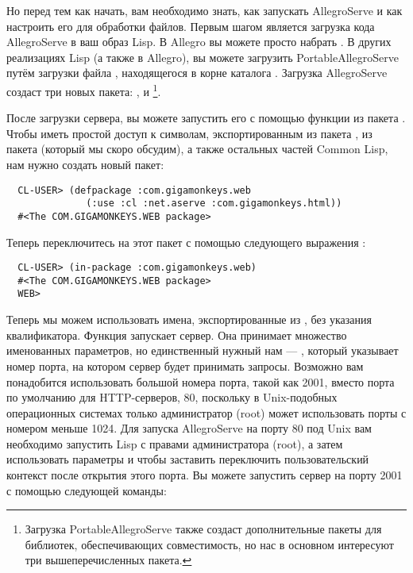 Но перед тем как начать, вам необходимо знать, как запускать AllegroServe и как настроить
его для обработки файлов. Первым шагом является загрузка кода AllegroServe в ваш образ
Lisp. В Allegro вы можете просто набрать . В других реализациях
Lisp (а также в Allegro), вы можете загрузить PortableAllegroServe путём загрузки файла
, находящегося в корне каталога . Загрузка
AllegroServe создаст три новых пакета: ,  и
\footnote{Загрузка PortableAllegroServe также создаст
  дополнительные пакеты для библиотек, обеспечивающих совместимость, но нас в основном
  интересуют три вышеперечисленных пакета.}.

После загрузки сервера, вы можете запустить его с помощью функции  из пакета
. Чтобы иметь простой доступ к символам, экспортированным из пакета
, из пакета  (который мы скоро обсудим), а
также остальных частей Common Lisp, нам нужно создать новый пакет:

\begin{lstlisting}
  CL-USER> (defpackage :com.gigamonkeys.web
              (:use :cl :net.aserve :com.gigamonkeys.html))
  #<The COM.GIGAMONKEYS.WEB package>
\end{lstlisting}

Теперь переключитесь на этот пакет с помощью следующего выражения :

\begin{lstlisting}
  CL-USER> (in-package :com.gigamonkeys.web)
  #<The COM.GIGAMONKEYS.WEB package>
  WEB>
\end{lstlisting} 

Теперь мы можем использовать имена, экспортированные из , без указания
квалификатора. Функция  запускает сервер. Она принимает множество именованных
параметров, но единственный нужный нам --- , который указывает номер порта, на
котором сервер будет принимать запросы.  Возможно вам понадобится использовать большой
номера порта, такой как 2001, вместо порта по умолчанию для HTTP-серверов, 80, поскольку в
Unix-подобных операционных системах только администратор (root) может использовать порты с
номером меньше 1024. Для запуска AllegroServe на порту 80 под Unix вам необходимо
запустить Lisp с правами администратора (root), а затем использовать параметры
 и  чтобы заставить  переключить пользовательский
контекст после открытия этого порта. Вы можете запустить сервер на порту 2001 с помощью
следующей команды:


